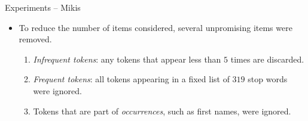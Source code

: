 \documentclass[12pt]{beamer}
\theoremstyle{break}
\DeclarePairedDelimiter\abs{\lvert}{\rvert}%
\begin{document}


\begin{frame}{Experiments -- Mikis}

	\begin{itemize}
		\item To reduce the number of items considered, several unpromising items were removed. \begin{enumerate}
    			\item \emph{Infrequent tokens}: any tokens that appear less than $5$ times are discarded.
    			\item \emph{Frequent tokens}: all tokens appearing in a fixed list of $319$ stop words were ignored.
    			\item Tokens that are part of \emph{occurrences}, such as first names, were ignored.
				\end{enumerate}	
	\end{itemize}
\end{frame}




\begin{frame}

	
	
\end{frame}


\end{document}
